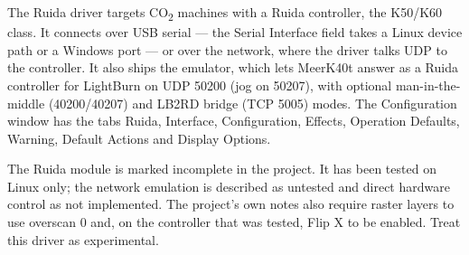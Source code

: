The Ruida driver targets CO\textsubscript{2} machines with a Ruida controller,
the K50/K60 class. It connects over USB serial --- the Serial Interface field
takes a Linux device path or a Windows  port --- or over the network,
where the driver talks UDP to the controller. It also ships the
 emulator, which lets MeerK40t answer as a Ruida controller
for LightBurn on UDP 50200 (jog on 50207), with optional man-in-the-middle
(40200/40207) and LB2RD bridge (TCP 5005) modes. The Configuration window has
the tabs Ruida, Interface, Configuration, Effects, Operation Defaults, Warning,
Default Actions and Display Options.

\begin{warnbox}
The Ruida module is marked incomplete in the project. It has been tested on
Linux only; the network emulation is described as untested and direct hardware
control as not implemented. The project's own notes also require raster layers
to use overscan 0 and, on the controller that was tested, Flip X to be enabled.
Treat this driver as experimental.
\end{warnbox}

